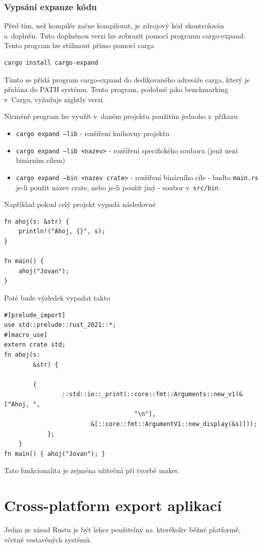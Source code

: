 \documentclass[a4paper, 12pt, twoside]{article} %
\newcommand{\bash}[1]{\texttt{#1}}
\begin{document}
		\subsubsection*{Vypsání expanze kódu}
			Před tím, než kompilér začne kompilovat, je zdrojový kód zkontrolován a~doplněn. Tuto doplněnou verzi lze zobrazit pomocí programu cargo-expand. Tento program lze stáhnout přímo pomocí carga
			\begin{verbatim}
cargo install cargo-expand
			\end{verbatim}
			
			Tímto se přidá program cargo-expand do dedikovaného adresáře carga, který je přidána do PATH systému. Tento program, podobně jako benchmarking v~Cargu, vyžaduje nightly verzi.
			
			Nicméně program lze využít v~daném projektu použitím jednoho z~příkazu
			\begin{itemize}
				\item \bash{cargo expand --lib} - rozšíření knihovny projektu
				\item \bash{cargo expand --lib <nazev>} - rozšíření specifického souboru (jenž není binárním cílem)
				\item \bash{cargo expand --bin <nazev crate>} - rozšíření binárního cíle - buďto \texttt{main.rs} je-li použit název crate, nebo je-li použit jiný - soubor v~\texttt{src/bin}.
			\end{itemize}

			Například pokud celý projekt vypadá následovně
			\begin{verbatim}
fn ahoj(s: &str) {
	println!("Ahoj, {}", s);
}

fn main() {
	ahoj("Jovan");
}
			\end{verbatim}
			
			Poté bude výsledek vypadat takto
			\begin{verbatim}
#[prelude_import]
use std::prelude::rust_2021::*;
#[macro_use]
extern crate std;
fn ahoj(s:
		&str) {

		{
				::std::io::_print(::core::fmt::Arguments::new_v1(&["Ahoj, ",
									"\n"],
						&[::core::fmt::ArgumentV1::new_display(&s)]));
			};
	}
fn main() { ahoj("Jovan"); }
			\end{verbatim}
			
			Tato funkcionalita je zejména užitečná při tvorbě maker.


\section{Cross-platform export aplikací}
	Jedna ze zásad Rustu je být lehce použitelný na~kterékoliv běžné platformě, včetně vestavěných systémů.
	
\end{document}
